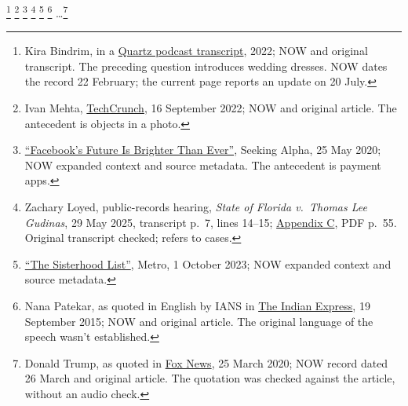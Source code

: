 \documentclass[12pt]{article}
\begin{document}
\ea\label{ex:quant-existentials}
\ea\label{ex:multiple-bare} \footnote{Kira Bindrim, in a \href{https://qz.com/india/2130303/the-big-fat-indian-wedding-is-only-getting-bigger}{Quartz podcast transcript}, 2022; NOW and original transcript. The preceding question introduces wedding dresses. NOW dates the record 22 February; the current page reports an update on 20 July.}
\ex\label{ex:multiple-exist-part} \footnote{Ivan Mehta, \href{https://techcrunch.com/2022/09/16/ios-16-users-are-getting-creative-with-the-new-background-removal-feature-for-photos/}{TechCrunch}, 16 September 2022; NOW and original article. The antecedent is objects in a photo.}
\ex\label{ex:countless-exist-part} \footnote{\href{https://seekingalpha.com/article/4349886-facebooks-future-is-brighter-ever}{\enquote{Facebook's Future Is Brighter Than Ever}}, Seeking Alpha, 25 May 2020; NOW expanded context and source metadata. The antecedent is payment apps.}
\ex\label{ex:multiple-exist-rel} \footnote{Zachary Loyed, public-records hearing, \textit{State of Florida v.~Thomas Lee Gudinas}, 29 May 2025, transcript p.~7, lines 14--15; \href{https://www.supremecourt.gov/DocketPDF/24/24-7457/363457/20250618100158557_Appendix\%20to\%20the\%20Petition\%20for\%20Writ\%20of\%20Certiorari-06-18-25.pdf}{Appendix C}, PDF p.~55. Original transcript checked;  refers to cases.}
\ex\label{ex:countless-exist-rel} \footnote{\href{https://metro.co.uk/2023/10/01/the-sisterhood-list-saluting-the-uk-black-women-whove-opened-doors-for-others-19558944/}{\enquote{The Sisterhood List}}, Metro, 1 October 2023; NOW expanded context and source metadata.}
\ex\label{ex:numerous-exist} \footnote{Nana Patekar, as quoted in English by IANS in \href{https://indianexpress.com/article/entertainment/bollywood/nana-patekars-foundation-collects-rs-80-lakh-for-drought-hit-farmers/}{The Indian Express}, 19 September 2015; NOW and original article. The original language of the speech wasn't established.}
\ex\label{ex:certain-exist}  \ldots\footnote{Donald Trump, as quoted in \href{https://www.foxnews.com/politics/trump-throws-support-behind-coronavirus-stimulus-bill-in-senate-vows-to-sign-vital-legislation-immediately}{Fox News}, 25 March 2020; NOW record dated 26 March and original article. The quotation was checked against the article, without an audio check.}
\z\z
\end{document}
